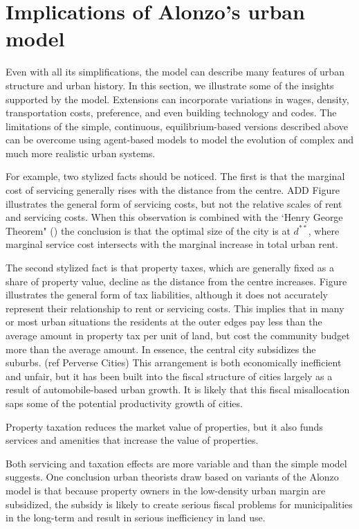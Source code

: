  
\section{Implications of Alonzo's urban model}
Even with all its simplifications, the model  can  describe  many features of urban structure and urban history. In this section, we illustrate some of the insights supported by the model. Extensions can incorporate variations in wages, density, transportation costs,  preference, and even building technology and codes. The limitations of the simple, continuous, equilibrium-based versions described above can be overcome using agent-based models to model the evolution of complex and much more realistic urban systems. 

For example, two stylized facts should be noticed. The first is that the marginal cost of servicing generally  rises with the distance from the centre.  ADD Figure
illustrates the general form of servicing costs, but not  the relative scales of rent and servicing costs. When this observation is combined with the `Henry George Theorem" () the conclusion is that the optimal size of the city  is at  $d^{**}$, where marginal service cost intersects with the marginal increase in total urban rent. 

The second stylized fact  is that property taxes, which are generally  fixed as a share of property value, decline as the distance from the centre increases. Figure %
illustrates the general form of tax liabilities, although it does not  accurately represent their relationship to rent or  servicing costs.  This implies that in many or most urban situations the residents at the outer edges pay less than the average amount in property tax per unit of land, but cost  the community budget more than the average amount. In essence, the central city subsidizes the suburbs. (ref Perverse Cities)
This arrangement is both economically inefficient and unfair, but it has been built into the fiscal structure of cities largely as a result of automobile-based urban growth. It is likely that this fiscal misallocation saps some of the potential productivity growth of cities.

Property taxation reduces the market value of properties, but it also funds services and amenities that increase the value of properties. 

Both servicing and taxation effects are more variable and than the simple model suggests.  One conclusion urban theorists draw based on variants of the Alonzo model is that because property owners in the low-density urban margin are subsidized,  the subsidy is likely to create serious fiscal problems for municipalities in the long-term and result in serious inefficiency in land use.

